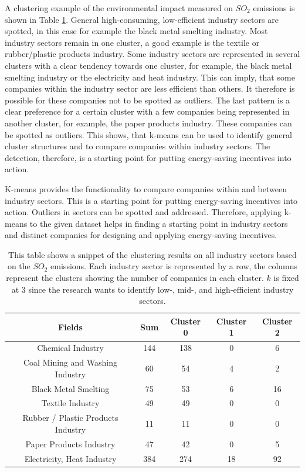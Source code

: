 A clustering example of the environmental impact measured on $SO_2$ emissions is shown in Table \ref{tab:multi_industries_clustering_results_based_on_the_so2_emission}.
General high-consuming, low-efficient industry sectors are spotted, in this case for example the black metal smelting industry.
Most industry sectors remain in one cluster, a good example is the textile or rubber/plastic products industry.
Some industry sectors are represented in several clusters with a clear tendency towards one cluster, for example, the black metal smelting industry or the electricity and heat industry.
This can imply, that some companies within the industry sector are less efficient than others.
It therefore is possible for these companies not to be spotted as outliers.
The last pattern is a clear preference for a certain cluster with a few companies being represented in another cluster, for example, the paper products industry.
These companies can be spotted as outliers.
This shows, that k-means can be used to identify general cluster structures and to compare companies within industry sectors.
The detection, therefore, is a starting point for putting energy-saving incentives into action.

K-means provides the functionality to compare companies within and between industry sectors.
This is a starting point for putting energy-saving incentives into action.
Outliers in sectors can be spotted and addressed.
Therefore, applying k-means to the given dataset helps in finding a starting point in industry sectors and distinct companies for designing and applying energy-saving incentives.

\begin{table}[h]
    \centering
    \begin{tabular}{|c|c|c|c|c|}
        \hline
        \textbf{Fields} & \textbf{Sum} & \textbf{Cluster 0} & \textbf{Cluster 1} & \textbf{Cluster 2} \\
        \hline
        Chemical Industry & 144 & 138 & 0 & 6 \\
        Coal Mining and Washing Industry & 60 & 54 & 4 & 2 \\
        Black Metal Smelting & 75 & 53 & 6 & 16 \\
        Textile Industry & 49 & 49 & 0 & 0 \\
        Rubber / Plastic Products Industry & 11 & 11 & 0 & 0 \\
        Paper Products Industry & 47 & 42 & 0 & 5 \\
        Electricity, Heat Industry & 384 & 274 & 18 & 92 \\
        \hline
    \end{tabular}
    \caption{This table shows a snippet of the clustering results on all industry sectors based on the $SO_2$ emissions.
    Each industry sector is represented by a row, the columns represent the clusters showing the number of companies in each cluster.
    $k$ is fixed at $3$ since the research wants to identify low-, mid-, and high-efficient industry sectors.
    }
    \label{tab:multi_industries_clustering_results_based_on_the_so2_emission}
\end{table}

